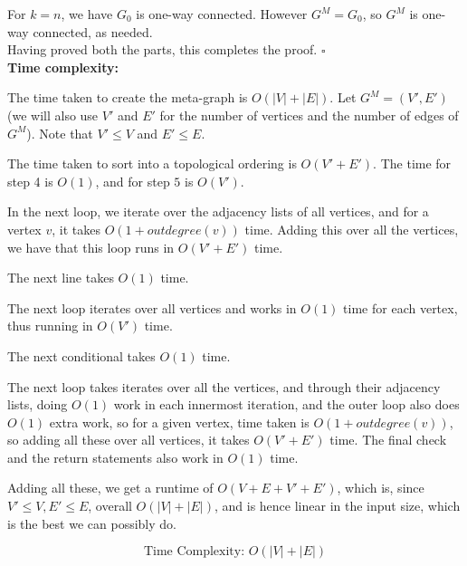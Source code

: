 \documentclass[answers]{exam}
\begin{document}
\begin{questions}
\begin{solution}
For $k = n$, we have $G_0$ is one-way connected. However $G^M = G_0$, so $G^M$ is one-way connected, as needed.\\

Having proved both the parts, this completes the proof. \hfill $\square$\\




\textbf{Time complexity:}

The time taken to create the meta-graph is $O(|V| + |E|)$. Let $G^M = (V', E')$ (we will also use $V'$ and $E'$ for the number of vertices and the number of edges of $G^M$). Note that $V' \le V$ and $E' \le E$.

The time taken to sort into a topological ordering is $O(V' + E')$.  The time for step 4 is $O(1)$, and for step $5$ is $O(V')$.

In the next loop, we iterate over the adjacency lists of all vertices, and for a vertex $v$, it takes $O(1 + outdegree(v))$ time. Adding this over all the vertices, we have that this loop runs in $O(V' + E')$ time.

The next line takes $O(1)$ time.

The next loop iterates over all vertices and works in $O(1)$ time for each vertex, thus running in $O(V')$ time.

The next conditional takes $O(1)$ time.

The next loop takes iterates over all the vertices, and through their adjacency lists, doing $O(1)$ work in each innermost iteration, and the outer loop also does $O(1)$ extra work, so for a given vertex, time taken is $O(1 + outdegree(v))$, so adding all these over all vertices, it takes $O(V' + E')$ time. The final check and the return statements also work in $O(1)$ time.

Adding all these, we get a runtime of $O(V + E + V' + E')$, which is, since $V' \le V, E' \le E$, overall $O(|V| + |E|)$, and is hence linear in the input size, which is the best we can possibly do.

\[
    \text{Time Complexity: } O (|V| + |E|)
\]

\end{solution}

\end{questions}
\end{document}
